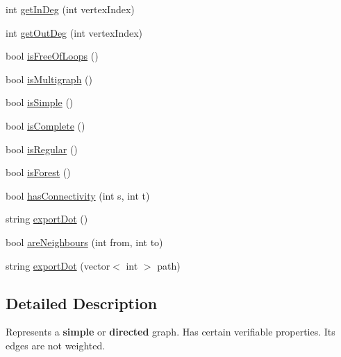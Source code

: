 \begin{DoxyCompactItemize}
\item 
int \hyperlink{class_graph_aa22848281e37e921bf4fc998bcf66295}{get\-In\-Deg} (int vertex\-Index)
\item 
int \hyperlink{class_graph_a1facc5271ce6c09e06bce134ddaac98c}{get\-Out\-Deg} (int vertex\-Index)
\item 
bool \hyperlink{class_graph_a451bbc2d9ddde5e85d6c122a845dbd02}{is\-Free\-Of\-Loops} ()
\item 
bool \hyperlink{class_graph_ab410dec3635c080f04c60c6835d91df6}{is\-Multigraph} ()
\item 
bool \hyperlink{class_graph_a4095f5949d5b2a420ecf2d0f2bb68dc8}{is\-Simple} ()
\item 
bool \hyperlink{class_graph_aba9eba8899f63a67ed270ee00bdfeb4e}{is\-Complete} ()
\item 
bool \hyperlink{class_graph_afe19c30e6b7005fd0c66c5f182764ca5}{is\-Regular} ()
\item 
bool \hyperlink{class_graph_a3c59cca56e627174ff1138c332dcc328}{is\-Forest} ()
\item 
bool \hyperlink{class_graph_a46cb0098da247fd0f2b07229df8cd5e7}{has\-Connectivity} (int s, int t)
\item 
string \hyperlink{class_graph_aaa3e920d6063f97f1826ced6180962ee}{export\-Dot} ()
\item 
bool \hyperlink{class_graph_ad3689ff1213976a5d738813be6ecee0d}{are\-Neighbours} (int from, int to)
\item 
string \hyperlink{class_graph_a5898714a35ec10f29610e6e06f82c8c8}{export\-Dot} (vector$<$ int $>$ path)
\end{DoxyCompactItemize}


\subsection{Detailed Description}
Represents a {\bfseries simple} or {\bfseries directed} graph. Has certain verifiable properties. Its edges are not weighted. 


